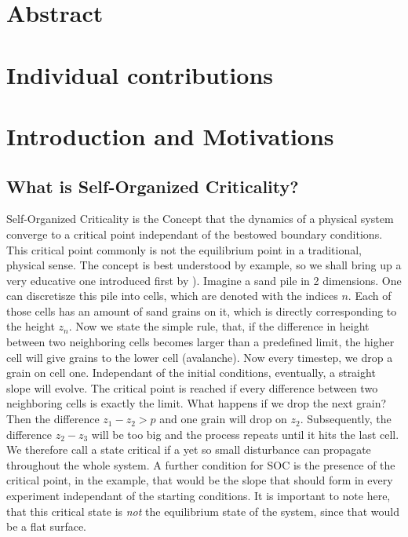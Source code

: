 \documentclass[11pt]{article}
\begin{document}



\section{Abstract}

\section{Individual contributions}

\section{Introduction and Motivations}
\subsection{What is Self-Organized Criticality?}
Self-Organized Criticality is the Concept that the dynamics of a physical system converge to a critical point independant of the bestowed boundary conditions. This critical point commonly is not the equilibrium point in a traditional, physical sense. The concept is best understood by example, so we shall bring up a very educative one introduced first by \cite{bak88} ). 
Imagine a sand pile in 2 dimensions. One can discretisze this pile into cells, which are denoted with the indices $n$. Each of those cells has an amount of sand grains on it, which is directly corresponding to the height $z_{n}$. Now we state the simple rule, that, if the difference in height between two neighboring cells becomes larger than a predefined limit, the higher cell will give grains to the lower cell (avalanche). Now every timestep, we drop a grain on cell one. Independant of the initial conditions, eventually, a straight slope will evolve. The critical point is reached if every difference between two neighboring cells is exactly the limit. What happens if we drop the next grain? Then the difference $z_{1}-z_{2}>p$ and one grain will drop on $z_{2}$. Subsequently, the difference $z_{2}-z_{3}$ will be too big and the process repeats until it hits the last cell. We therefore call a state critical if a yet so small disturbance can propagate throughout the whole system. A further condition for SOC is the presence of the critical point, in the example, that would be the slope that should form in every experiment independant of the starting conditions. 
It is important to note here, that this critical state is \emph{not} the equilibrium state of the system, since that would be a flat surface. 
\end{document}
